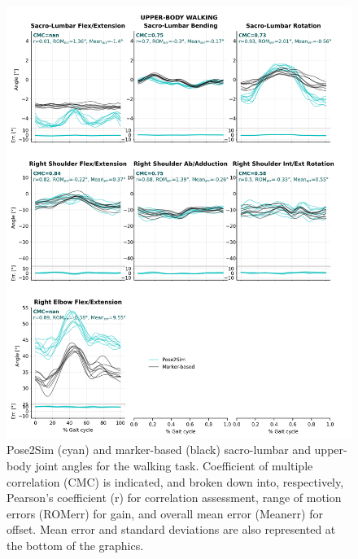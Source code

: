 \begin{figure}[!ht]
	\centering
	\def\svgwidth{1\columnwidth}
	\fontsize{10pt}{10pt}\selectfont
	\includegraphics[height=\dimexpr\textheight-119pt]{"../Annexes/Figures/Fig_QTMWalkUp.png"}
	\caption{Pose2Sim (cyan) and marker-based (black) sacro-lumbar and upper-body joint angles for the walking task. Coefficient of multiple correlation (CMC) is indicated, and broken down into, respectively, Pearson’s coefficient (r) for correlation assessment, range of motion errors (ROMerr) for gain, and overall mean error (Meanerr) for offset. Mean error and standard deviations are also represented at the bottom of the graphics.}
	\label{fig_qtmwalkup}
\end{figure}

